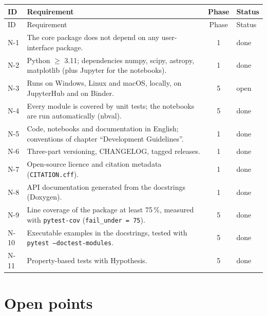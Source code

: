 \begin{longtable}{@{}l>{\raggedright\arraybackslash}p{8.6cm}cl@{}}
\toprule
ID & Requirement & Phase & Status \\
\midrule
\endfirsthead
\toprule
ID & Requirement & Phase & Status \\
\midrule
\endhead
\bottomrule
\endfoot
N-1 & The core package does not depend on any user-interface
  package. & 1 & done \\
N-2 & Python $\geq$ 3.11; dependencies numpy, scipy, astropy,
  matplotlib (plus Jupyter for the notebooks). & 1 & done \\
N-3 & Runs on Windows, Linux and macOS, locally, on JupyterHub and on
  Binder. & 5 & open \\
N-4 & Every module is covered by unit tests; the notebooks are run
  automatically (nbval). & 5 & done \\
N-5 & Code, notebooks and documentation in English; conventions of
  chapter \enquote{Development Guidelines}. & 1 & done \\
N-6 & Three-part versioning, CHANGELOG, tagged releases. & 1 & done \\
N-7 & Open-source licence and citation metadata
  (\texttt{CITATION.cff}). & 1 & done \\
N-8 & API documentation generated from the docstrings
  (Doxygen). & 1 & done \\
N-9 & Line coverage of the package at least 75\,\%, measured with
  \texttt{pytest-cov} (\texttt{fail\_under = 75}). & 5 & done \\
N-10 & Executable examples in the docstrings, tested with
  \texttt{pytest --doctest-modules}. & 5 & done \\
N-11 & Property-based tests with Hypothesis. & 5 & done \\
\end{longtable}

\section{Open points}

